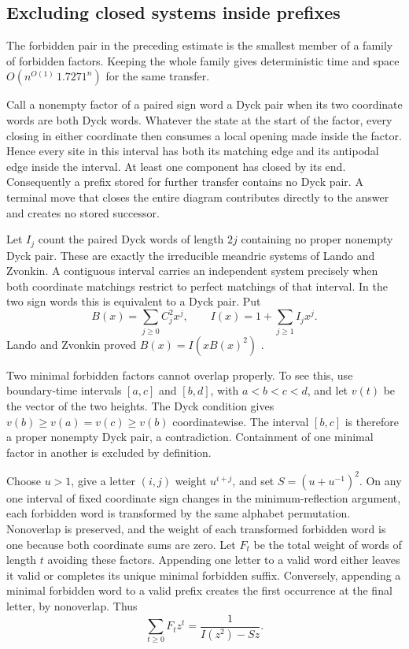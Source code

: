 \subsection{Excluding closed systems inside prefixes}
\label{sec:projective-factor-bound}

The forbidden pair in the preceding estimate is the smallest member
of a family of forbidden factors. Keeping the whole family gives
deterministic time and space \(O(n^{O(1)}\,1.7271^n)\) for the same
transfer.

Call a nonempty factor of a paired sign word a Dyck pair when its two
coordinate words are both Dyck words. Whatever the state at the
start of the factor, every closing in either coordinate then consumes
a local opening made inside the factor. Hence every site in this
interval has both its matching edge and its antipodal edge inside
the interval. At least one component has closed by its end.
Consequently a prefix stored for further transfer contains no Dyck
pair. A terminal move that closes the entire diagram contributes
directly to the answer and creates no stored successor.

Let \(I_j\) count the paired Dyck words of length \(2j\) containing no
proper nonempty Dyck pair. These are exactly the irreducible
meandric systems of Lando and Zvonkin. A contiguous interval carries
an independent system precisely when both coordinate matchings
restrict to perfect matchings of that interval. In the two sign
words this is equivalent to a Dyck pair. Put
\[
 B(x)=\sum_{j\ge0}C_j^2x^j,\qquad I(x)=1+\sum_{j\ge1} I_j x^j.
\]
Lando and Zvonkin proved \(B(x)=I(xB(x)^2)\) \cite{lz}.

Two minimal forbidden factors cannot overlap properly. To see this,
use boundary-time intervals \([a,c]\) and \([b,d]\), with
\(a<b<c<d\), and let \(v(t)\) be the vector of the two heights.
The Dyck condition gives \(v(b)\ge v(a)=v(c)\ge v(b)\)
coordinatewise. The interval \([b,c]\) is therefore a proper
nonempty Dyck pair, a contradiction. Containment of one minimal
factor in another is excluded by definition.

Choose \(u>1\), give a letter \((i,j)\) weight \(u^{i+j}\), and set
\(S=(u+u^{-1})^2\). On any one interval of fixed coordinate sign
changes in the minimum-reflection argument, each forbidden word is
transformed by the same alphabet permutation. Nonoverlap is
preserved, and the weight of each transformed forbidden word is
one because both coordinate sums are zero. Let \(F_t\) be the
total weight of words of length \(t\) avoiding these factors.
Appending one letter to a valid word either leaves it valid or
completes its unique minimal forbidden suffix. Conversely, appending
a minimal forbidden word to a valid prefix creates the first
occurrence at the final letter, by nonoverlap. Thus
\[
 \sum_{t\ge0}F_t z^t=\frac1{I(z^2)-S z}.
\]

